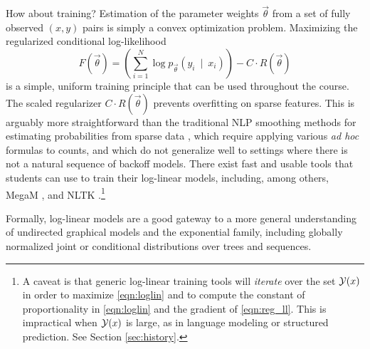 \documentclass[11pt,letterpaper]{article}
\DeclareMathOperator*{\argmax}{arg\,max}
\begin{document}
How about training?  Estimation of the parameter weights
$\vec{\theta}$ from a set of fully observed $(x,y)$ pairs is simply a
convex optimization problem.  Maximizing the regularized conditional
log-likelihood
\begin{equation}\label{eqn:reg_ll}
  F(\vec{\theta}) = \left( \sum_{i=1}^N \log{p_{\vec{\theta}}\left(y_i\ \mid\ x_i\right)} \right) - C \cdot R(\vec{\theta})
\end{equation}
is a simple, uniform training principle that can be used throughout
the course.  The scaled regularizer $C\cdot R(\vec{\theta})$
prevents overfitting on sparse features.
This is arguably more straightforward than the traditional NLP
smoothing methods for estimating probabilities from sparse data
\cite{chen-goodman-1996}, which require applying various {\em ad hoc}
formulas to counts, and which do not generalize well to settings where
there is not a natural sequence of backoff models.  There exist 
fast and usable tools that students can use to train their log-linear
models, including, among others, MegaM \cite{daume04cg-bfgs}, 
and NLTK \cite{bird2009natural}.\footnote{\label{fn:bigY}A caveat is that generic
  log-linear training tools will {\em iterate} over the set ${\cal
    Y}(x)$ in order to maximize
  \eqref{eqn:loglin} and to compute the constant of proportionality
  in \eqref{eqn:loglin} and the gradient of
  \eqref{eqn:reg_ll}.  This is impractical when ${\cal Y}(x)$ is large, as in
  language modeling or structured prediction.  See Section \ref{sec:history}.
}

Formally, log-linear models are a good gateway to a more general
understanding of undirected graphical models and the exponential
family, including globally normalized joint or conditional
distributions over trees and sequences.
\end{document}
